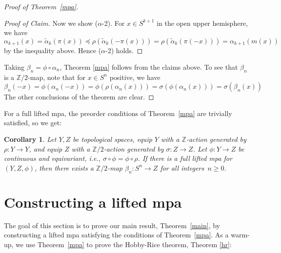 \documentclass[11pt, reqno, english]{amsart}
\theoremstyle{plain}
\newtheorem{corollary}[theorem]{Corollary}
\theoremstyle{definition}
\newcommand{\Z}{\mathbb{Z}}
\begin{document}
\begin{proof}[Proof of Theorem~\ref{mpa}]
\begin{proof}[Proof of Claim]
    Now we show ($\alpha$-2). For $x \in S^{k+1}$ in the open upper hemisphere,
    we have
    $$\alpha_{k + 1}(x) = \widetilde{\alpha}_{k}(\pi(x)) \preceq
    \rho(\widetilde{\alpha}_{k}(-\pi(x))) =
    \rho(\widetilde{\alpha}_{k}(\pi(-x))) = \alpha_{k + 1}(m(x))$$
    by the inequality above. Hence ($\alpha$-2) holds.
  \end{proof}

  Taking $\beta_{n} = \phi \circ \alpha_{n}$, Theorem \ref{mpa} follows from
  the claims above. To see that $\beta_{n}$ is a $\Z/2$-map, note that for $x
  \in S^{n}$ positive, we have
  $$\beta_{n}(-x) = \phi(\alpha_{n}(-x)) = \phi(\rho(\alpha_{n}(x))) =
  \sigma(\phi(\alpha_{n}(x))) = \sigma(\beta_{n}(x))$$
  The other conclusions of the theorem are clear.
\end{proof}

% 

For a full lifted mpa, the preorder conditions of Theorem~\ref{mpa} are trivially satisfied, so we get:

\begin{corollary}
  Let $Y, Z$ be topological spaces, equip $Y$ with a $\Z$-action generated by
  $\rho\colon Y \rightarrow Y$, and equip $Z$ with a $\Z/2$-action generated
  by $\sigma\colon Z \rightarrow Z$. Let $\phi\colon Y \rightarrow Z$ be
  continuous and equivariant, i.e., $\sigma\circ\phi =  \phi\circ\rho$.
  If there is a full lifted mpa for $(Y, Z, \phi)$, then there exists a
  $\Z/2$-map $\beta_{n}\colon S^{n} \rightarrow Z$ for all integers~$n \ge 0$.
\end{corollary}











\section{Constructing a lifted mpa}
\label{sec:construction}

The goal of this section is to prove our main result, Theorem~\ref{main}, by
constructing a lifted mpa satisfying the conditions of Theorem~\ref{mpa}. As a
warm-up, we use Theorem~\ref{mpa} to prove the Hobby-Rice theorem, Theorem
\ref{hr}:
\end{document}
